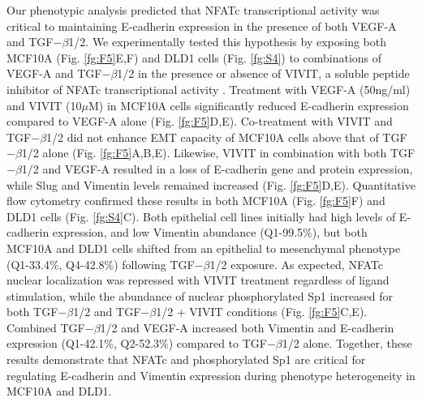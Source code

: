 \documentclass[11pt,letterpaper]{article}
\begin{document}
Our phenotypic analysis predicted that NFATc transcriptional activity was critical to maintaining E-cadherin expression in the presence of both VEGF-A and TGF$-\beta$1/2.
We experimentally tested this hypothesis by exposing both MCF10A (Fig. \ref{fg:F5}E,F) and DLD1 cells (Fig. \ref{fg:S4}) to combinations of VEGF-A and TGF$-\beta$1/2 in the presence or absence of VIVIT, a soluble peptide inhibitor of NFATc transcriptional activity \cite{Aramburu:1999if}.
Treatment with VEGF-A (50ng/ml) and VIVIT (10$\mu$M) in MCF10A cells significantly reduced E-cadherin expression compared to VEGF-A alone (Fig. \ref{fg:F5}D,E).
Co-treatment with VIVIT and TGF$-\beta$1/2 did not enhance EMT capacity of MCF10A cells above that of TGF$-\beta$1/2 alone (Fig. \ref{fg:F5}A,B,E).
Likewise, VIVIT in combination with both TGF$-\beta$1/2 and VEGF-A resulted in a loss of E-cadherin gene and protein expression, while Slug and Vimentin levels remained increased (Fig. \ref{fg:F5}D,E).
Quantitative flow cytometry confirmed these results in both MCF10A (Fig. \ref{fg:F5}F) and DLD1 cells (Fig. \ref{fg:S4}C).
Both epithelial cell lines initially had high levels of E-cadherin expression, and low Vimentin abundance (Q1-99.5\%), but both MCF10A and DLD1 cells shifted from an epithelial to mesenchymal phenotype (Q1-33.4\%, Q4-42.8\%) following TGF$-\beta$1/2 exposure.
As expected, NFATc nuclear localization was repressed with VIVIT treatment regardless of ligand stimulation, while the abundance of nuclear phosphorylated Sp1 increased for both TGF$-\beta$1/2 and TGF$-\beta$1/2 + VIVIT conditions (Fig. \ref{fg:F5}C,E).
Combined TGF$-\beta$1/2 and VEGF-A increased both Vimentin and E-cadherin expression (Q1-42.1\%, Q2-52.3\%) compared to TGF$-\beta$1/2 alone.
Together, these results demonstrate that NFATc and phosphorylated Sp1 are critical for regulating E-cadherin and Vimentin expression during phenotype heterogeneity in MCF10A and DLD1.
\end{document}

